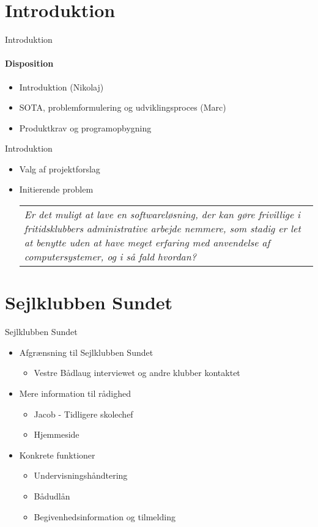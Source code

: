 \section{Introduktion}

\begin{frame}{Introduktion}
\framesubtitle{Disposition}
	\begin{itemize}
	\item Introduktion (Nikolaj)
	\item SOTA, problemformulering og udviklingsproces (Marc)
	\item Produktkrav og programopbygning
	
	
	\end{itemize}

\end{frame}

\begin{frame}{Introduktion}
	\begin{itemize}	
	\item Valg af projektforslag
	\item Initierende problem			
	\newline
		
		\begin{tabular}{|p{8cm}|}
		\textit{Er det muligt at lave en softwareløsning, der kan gøre frivillige i fritidsklubbers administrative
		arbejde nemmere, som stadig er let at benytte uden at have meget erfaring med anvendelse af computersystemer, og i så fald hvordan?}
  		\end{tabular}
	\end{itemize}
\end{frame}


\section{Sejlklubben Sundet}

\begin{frame}{Sejlklubben Sundet}

	\begin{itemize}
	\item Afgrænsning til Sejlklubben Sundet
			\begin{itemize}
			\item Vestre Bådlaug interviewet og andre klubber kontaktet
			\end{itemize}
	\item Mere information til rådighed
			\begin{itemize}
			\item Jacob - Tidligere skolechef
			\item Hjemmeside
			\end{itemize} 
	\item Konkrete funktioner
		\begin{itemize}
		\item Undervisningshåndtering
		\item Bådudlån
		\item Begivenhedsinformation og tilmelding
		\end{itemize}
	
	\end{itemize}
	
\end{frame}